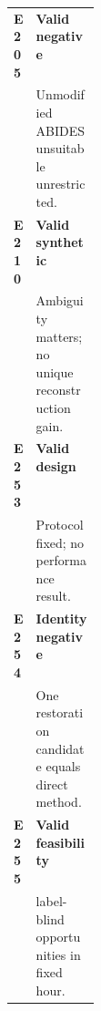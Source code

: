 \documentclass[10pt,a4paper]{article}
\begin{document}
\begin{minipage}[t]{0.485\textwidth}
\begin{tabularx}{\linewidth}{@{}>{\bfseries\sffamily}p{0.11\linewidth}>{\raggedright\arraybackslash}X@{}}
E205 & {\bfseries\color{statusgreen} Valid negative}\\[-1pt] & Unmodified ABIDES unsuitable unrestricted.\\[3pt]
E210 & {\bfseries\color{statusgreen} Valid synthetic}\\[-1pt] & Ambiguity matters; no unique reconstruction gain.\\[3pt]
E253 & {\bfseries\color{statusgreen} Valid design}\\[-1pt] & Protocol fixed; no performance result.\\[3pt]
E254 & {\bfseries\color{statusgreen} Identity negative}\\[-1pt] & One restoration candidate equals direct method.\\[3pt]
E255 & {\bfseries\color{statusgreen} Valid feasibility}\\[-1pt] & 21 label-blind opportunities in fixed hour.\\[3pt]
\end{tabularx}
\end{minipage}\hfill
\end{document}
